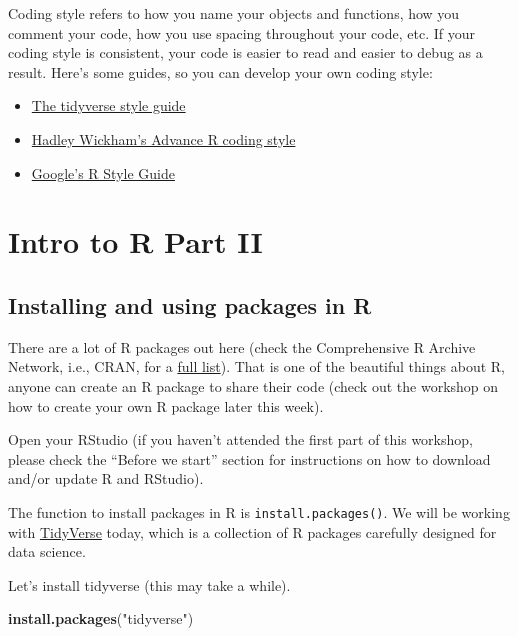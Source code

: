 \documentclass[]{book}
\newenvironment{Shaded}{\begin{snugshade}}{\end{snugshade}}
\newcommand{\KeywordTok}[1]{\textcolor[rgb]{0.13,0.29,0.53}{\textbf{#1}}}
\newcommand{\NormalTok}[1]{#1}
\newcommand{\StringTok}[1]{\textcolor[rgb]{0.31,0.60,0.02}{#1}}
\begin{document}
Coding style refers to how you name your objects and functions, how you comment your code, how you use spacing throughout your code, etc. If your coding style is consistent, your code is easier to read and easier to debug as a result. Here's some guides, so you can develop your own coding style:

\begin{itemize}
\item
  \href{https://style.tidyverse.org}{The tidyverse style guide}
\item
  \href{http://adv-r.had.co.nz/Style.html}{Hadley Wickham's Advance R coding style}
\item
  \href{https://google.github.io/styleguide/Rguide.html}{Google's R Style Guide}
\end{itemize}

\hypertarget{partii}{%
\chapter{Intro to R Part II}\label{partii}}

\hypertarget{installing-and-using-packages-in-r}{%
\section{Installing and using packages in R}\label{installing-and-using-packages-in-r}}

There are a lot of R packages out here (check the Comprehensive R Archive Network, i.e., CRAN, for a \href{https://cran.r-project.org/web/packages/available_packages_by_name.html}{full list}). That is one of the beautiful things about R, anyone can create an R package to share their code (check out the workshop on how to create your own R package later this week).

Open your RStudio (if you haven't attended the first part of this workshop, please check the ``Before we start'' section for instructions on how to download and/or update R and RStudio).

The function to install packages in R is \texttt{install.packages()}. We will be working with \href{https://www.tidyverse.org/}{TidyVerse} today, which is a collection of R packages carefully designed for data science.

Let's install tidyverse (this may take a while).

\begin{Shaded}
\begin{Highlighting}[]
\KeywordTok{install.packages}\NormalTok{(}\StringTok{"tidyverse"}\NormalTok{)}
\end{Highlighting}
\end{Shaded}
\end{document}
